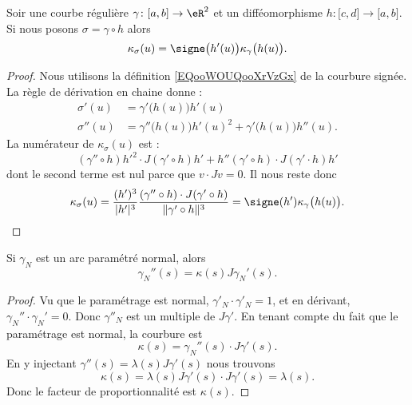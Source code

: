 \begin{lemma}
	Soir une courbe régulière \( \gamma\colon \mathopen[ a , b \mathclose]\to \eR^2\) et un difféomorphisme \( h\colon \mathopen[ c , d \mathclose]\to \mathopen[ a , b \mathclose]\). Si nous posons \( \sigma=\gamma\circ h\) alors
	\begin{equation}        \label{EQooSQNMooUKGhPd}
		\kappa_{\sigma}(u)=\signe\big( h'(u) \big)\kappa_{\gamma}\big( h(u) \big).
	\end{equation}
\end{lemma}

\begin{proof}
	Nous utilisons la définition \eqref{EQooWOUQooXrVzGx} de la courbure signée. La règle de dérivation en chaine donne :
	\begin{subequations}
		\begin{align}
			\sigma'(u)  & =\gamma'\big( h(u) \big)h'(u)                                   \\
			\sigma''(u) & =\gamma''\big( h(u) \big)h'(u)^2+\gamma'\big( h(u) \big)h''(u).
		\end{align}
	\end{subequations}
	La numérateur de \( \kappa_{\sigma}(u)\) est :
	\begin{equation}
		(\gamma''\circ h)h'^2\cdot J(\gamma'\circ h)h'+h''(\gamma'\circ h)\cdot J(\gamma'\cdot h)h'
	\end{equation}
	dont le second terme est nul parce que \( v\cdot Jv=0\). Il nous reste donc
	\begin{equation}
		\kappa_{\sigma}(u)=\frac{ (h')^3 }{ | h' |^3} \frac{ (\gamma''\circ h)\cdot J(\gamma'\circ h) }{ \| \gamma'\circ h \|^3 }=\signe(h')\kappa_{\gamma}\big( h(u) \big).
	\end{equation}
\end{proof}

\begin{lemma}        \label{LEMooKPORooEGJCRm}
	Si \( \gamma_N\) est un arc paramétré normal, alors
	\begin{equation}
		\gamma_N''(s)=\kappa(s)J\gamma_N'(s).
	\end{equation}
\end{lemma}

\begin{proof}
	Vu que le paramétrage est normal, \( \gamma'_N\cdot \gamma'_N=1\), et en dérivant, \( \gamma_N''\cdot\gamma_N'=0\). Donc \( \gamma''_N\) est un multiple de \( J\gamma'\). En tenant compte du fait que le paramétrage est normal, la courbure est
	\begin{equation}
		\kappa(s)=\gamma_N''(s)\cdot J\gamma'(s).
	\end{equation}
	En y injectant \( \gamma''(s)=\lambda(s)J\gamma'(s)\) nous trouvons
	\begin{equation}
		\kappa(s)=\lambda(s)J\gamma'(s)\cdot J\gamma'(s)=\lambda(s).
	\end{equation}
	Donc le facteur de proportionnalité est \( \kappa(s)\).
\end{proof}

